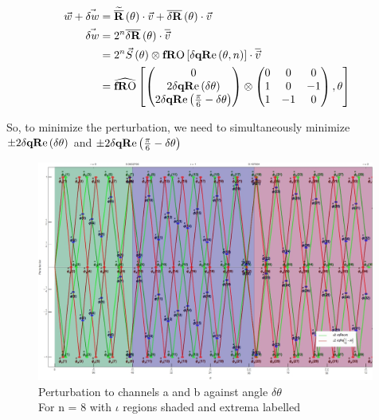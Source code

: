\begin{align*}
\w+\dW &= \nRa[\theta] \cdot \rgb+\dnR[\theta] \cdot \rgb \\
\dW &= 2^n\dnR[\theta] \cdot \normed{\rgb} \\
        &= 2^n\Scale[\theta] \otimes \fRO \left[ \dqRe[ \theta, n ] \right] \cdot \normed{\rgb} \\
        &= \fROm \left[  
        \begin{pmatrix}
         0                                     \\
         2 \dqRe[ \thetaA ]              \\
         2 \dqRe[ \Pii{6} -\thetaA]   \\
        \end{pmatrix} \otimes
        \begin{pmatrix}
         0  &    0  &   0  \\
         1  &    0  & -1  \\
         1  & - 1  &   0  \\
        \end{pmatrix}
          ,\theta \right]
\end{align*}

So, to minimize the perturbation, we need to simultaneously minimize $\pm 2 \dqRe[ \thetaA ]  $ and $\pm 2 \dqRe[ \Pii{6} -\thetaA]$




\begin{figure}
  \centering
    \includegraphics[width=0.99\textwidth]{Chapter2/Figs/PtbToChanBothWithPoints.jpg}
    \caption{ Perturbation to channels a and b against angle $\delta \theta$ \\
    For n = 8  with $\iota$ regions shaded and extrema labelled }  \label{fig:PtbToChan}
\end{figure}

